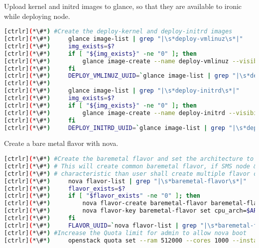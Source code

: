 	Upload kernel and initrd images to glance, so that they are available to ironic while deploying node.


\begin{lstlisting}[language=bash,keywords={}]
[ctrlr](*\#*) #Create the deploy-kernel and deploy-initrd images
[ctrlr](*\#*)     glance image-list | grep "|\s*deploy-vmlinuz\s*|"
[ctrlr](*\#*)     img_exists=$?
[ctrlr](*\#*)     if [ "${img_exists}" -ne "0" ]; then
[ctrlr](*\#*)         glance image-create --name deploy-vmlinuz --visibility public --disk-format aki --container-format aki < ${chpc_image_deploy_kernel}
[ctrlr](*\#*)     fi
[ctrlr](*\#*)     DEPLOY_VMLINUZ_UUID=`glance image-list | grep "|\s*deploy-vmlinuz\s*|" | awk '{print $2}'`
[ctrlr](*\#*) 
[ctrlr](*\#*)     glance image-list | grep "|\s*deploy-initrd\s*|"
[ctrlr](*\#*)     img_exists=$?
[ctrlr](*\#*)     if [ "${img_exists}" -ne "0" ]; then
[ctrlr](*\#*)         glance image-create --name deploy-initrd --visibility public --disk-format ari --container-format ari < ${chpc_image_deploy_ramdisk}
[ctrlr](*\#*)     fi
[ctrlr](*\#*)     DEPLOY_INITRD_UUID=`glance image-list | grep "|\s*deploy-initrd\s*|" | awk '{print $2}'`
\end{lstlisting} 

	Create a bare metal flavor with nova.


\begin{lstlisting}[language=bash,keywords={}]
[ctrlr](*\#*) #Create the baremetal flavor and set the architecture to x86_64
[ctrlr](*\#*) # This will create common baremetal flavor, if SMS node & compute has different
[ctrlr](*\#*) # characteristic than user shall create multiple flavor one each characterisitc
[ctrlr](*\#*)     nova flavor-list | grep "|\s*baremetal-flavor\s*|"
[ctrlr](*\#*)     flavor_exists=$?
[ctrlr](*\#*)     if [ "$flavor_exists" -ne "0" ]; then
[ctrlr](*\#*)         nova flavor-create baremetal-flavor baremetal-flavor ${RAM_MB} ${DISK_GB} ${CPU}
[ctrlr](*\#*)         nova flavor-key baremetal-flavor set cpu_arch=$ARCH
[ctrlr](*\#*)     fi
[ctrlr](*\#*)     FLAVOR_UUID=`nova flavor-list | grep "|\s*baremetal-flavor\s*|" | awk '{print $2}'`
[ctrlr](*\#*) #Increase the Quota limit for admin to allow nova boot
[ctrlr](*\#*)     openstack quota set --ram 512000 --cores 1000 --instances 100 admin
\end{lstlisting} 

